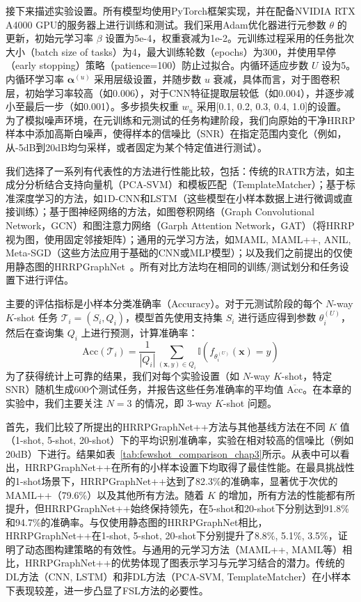 接下来描述实验设置。所有模型均使用PyTorch框架实现，并在配备NVIDIA RTX A4000 GPU的服务器上进行训练和测试。我们采用Adam优化器进行元参数 $\theta$ 的更新，初始元学习率 $\beta$ 设置为5e-4，权重衰减为1e-2。元训练过程采用的任务批次大小（batch size of tasks）为4，最大训练轮数（epochs）为300，并使用早停（early stopping）策略（patience=100）防止过拟合。内循环适应步数 $U$ 设为5。内循环学习率 $\boldsymbol{\alpha}^{(u)}$ 采用层级设置，并随步数 $u$ 衰减，具体而言，对于图卷积层，初始学习率较高（如0.006），对于CNN特征提取层较低（如0.004），并逐步减小至最后一步（如0.001）。多步损失权重 $w_u$ 采用[0.1, 0.2, 0.3, 0.4, 1.0]的设置。为了模拟噪声环境，在元训练和元测试的任务构建阶段，我们向原始的干净HRRP样本中添加高斯白噪声，使得样本的信噪比（SNR）在指定范围内变化（例如，从-5dB到20dB均匀采样，或者固定为某个特定值进行测试）。

我们选择了一系列有代表性的方法进行性能比较，包括：传统的RATR方法，如主成分分析结合支持向量机（PCA-SVM）和模板匹配（TemplateMatcher）；基于标准深度学习的方法，如1D-CNN和LSTM（这些模型在小样本数据上进行微调或直接训练）；基于图神经网络的方法，如图卷积网络（Graph Convolutional Network，GCN）和图注意力网络（Garph Attention Network，GAT）（将HRRP视为图，使用固定邻接矩阵）；通用的元学习方法，如MAML, MAML++, ANIL, Meta-SGD（这些方法应用于基础的CNN或MLP模型）；以及我们之前提出的仅使用静态图的HRRPGraphNet~\cite{Chen2024}。所有对比方法均在相同的训练/测试划分和任务设置下进行评估。

主要的评估指标是小样本分类准确率（Accuracy）。对于元测试阶段的每个 $N$-way $K$-shot 任务 $\mathcal{T}_i = (S_i, Q_i)$，模型首先使用支持集 $S_i$ 进行适应得到参数 $\theta_i^{(U)}$，然后在查询集 $Q_i$ 上进行预测，计算准确率：
\begin{equation}
    \text{Acc}(\mathcal{T}_i) = \frac{1}{|Q_i|} \sum_{(\mathbf{x},y) \in Q_i} \mathbb{I}(f_{\theta_i^{(U)}}(\mathbf{x}) = y)
    \label{eq:accuracy_metric}
\end{equation}
为了获得统计上可靠的结果，我们对每个实验设置（如 $N$-way $K$-shot，特定SNR）随机生成600个测试任务，并报告这些任务准确率的平均值 $\overline{\text{Acc}}$。在本章的实验中，我们主要关注 $N=3$ 的情况，即 3-way $K$-shot 问题。

首先，我们比较了所提出的HRRPGraphNet++方法与其他基线方法在不同 $K$ 值（1-shot, 5-shot, 20-shot）下的平均识别准确率，实验在相对较高的信噪比（例如20dB）下进行。结果如表~\ref{tab:fewshot_comparison_chap3}所示。从表中可以看出，HRRPGraphNet++在所有的小样本设置下均取得了最佳性能。在最具挑战性的1-shot场景下，HRRPGraphNet++达到了82.3\%的准确率，显著优于次优的MAML++（79.6\%）以及其他所有方法。随着 $K$ 的增加，所有方法的性能都有所提升，但HRRPGraphNet++始终保持领先，在5-shot和20-shot下分别达到91.8\%和94.7\%的准确率。与仅使用静态图的HRRPGraphNet相比，HRRPGraphNet++在1-shot, 5-shot, 20-shot下分别提升了8.8\%, 5.1\%, 3.5\%，证明了动态图构建策略的有效性。与通用的元学习方法（MAML++, MAML等）相比，HRRPGraphNet++的优势体现了图表示学习与元学习结合的潜力。传统的DL方法（CNN, LSTM）和非DL方法（PCA-SVM, TemplateMatcher）在小样本下表现较差，进一步凸显了FSL方法的必要性。

